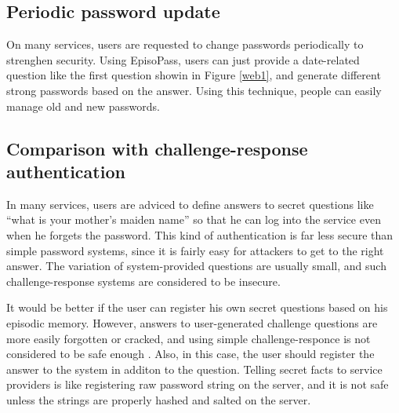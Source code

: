 \documentclass{article}
\begin{document}
\subsection{Periodic password update}

On many services, users are requested to change passwords periodically
to strenghen security.
%
%
Using EpisoPass, users can just provide a date-related question
like the first question showin in Figure \ref{web1},
and generate different strong passwords based on the answer.
Using this technique, people can easily manage old and new passwords.

\subsection{Comparison with challenge-response authentication}


In many services, users are adviced to define answers to secret questions like
``what is your mother's maiden name''
so that he can log into the service even when he forgets the password.
This kind of authentication is far less secure than simple password systems,
since it is fairly easy for attackers to get to the right answer.
The variation of system-provided questions are usually small, and
such challenge-response systems are considered to be
insecure\cite{Rabkin:2008:PKQ:1408664.1408667}.

It would be better if the user can register his own secret questions
based on his episodic memory.
However, answers to user-generated challenge questions are more easily
forgotten or cracked,
and using simple challenge-responce is not considered to be safe enough
\cite{Just:2009:PCC:1572532.1572543}\cite{Schechter:2009:NSM:1607723.1608145}.
%
Also, in this case,
the user should register the answer to the system in additon to the question.
Telling secret facts to service providers is like
registering raw password string on the server,
and it is not safe unless the strings are properly hashed and salted on the server.
\end{document}
